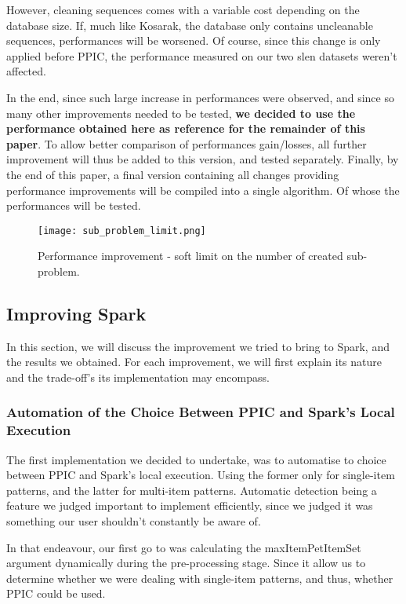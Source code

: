 \documentclass{eplmastersthesis}
\begin{document}
However, cleaning sequences comes with a variable cost depending on the database size. If, much like Kosarak, the database only contains uncleanable sequences, performances will be worsened. Of course, since this change is only applied before PPIC, the performance measured on our two slen datasets weren't affected. \newline

In the end, since such large increase in performances were observed, and since so many other improvements needed to be tested, \textbf{we decided to use the performance obtained here as reference for the remainder of this paper}. To allow better comparison of performances gain/losses, all further improvement will thus be added to this version, and tested separately. Finally, by the end of this paper, a final version containing all changes providing performance improvements will be compiled into a single algorithm. Of whose the performances will be tested.

\begin{figure}[h]
  \centering
  \texttt{[image: sub\_problem\_limit.png]}
  \caption{Performance improvement - soft limit on the number of created sub-problem.}
  \label{fig:sub_problem_limit}
\end{figure}

\subsection{Improving Spark}

In this section, we will discuss the improvement we tried to bring to Spark, and the results we obtained. For each improvement, we will first explain its nature and the trade-off's its implementation may encompass.

\subsubsection{Automation of the Choice Between PPIC and Spark's Local Execution}

The first implementation we decided to undertake, was to automatise to choice between PPIC and Spark's local execution. Using the former only for single-item patterns, and the latter for multi-item patterns. Automatic detection being a feature we judged important to implement efficiently, since we judged it was something our user shouldn't constantly be aware of. \newline 

In that endeavour, our first go to was calculating the maxItemPetItemSet argument dynamically during the pre-processing stage. Since it allow us to determine whether we were dealing with single-item patterns, and thus, whether PPIC could be used. \newline
\end{document}
